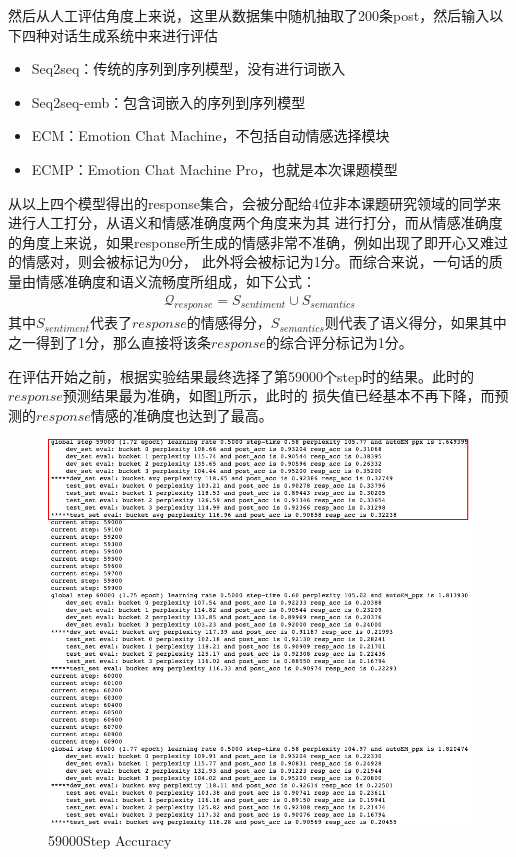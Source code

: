 \documentclass[supercite]{HustGraduPaper}
\theoremstyle{definition}
\begin{document}
然后从人工评估角度上来说，这里从数据集中随机抽取了200条post，然后输入以下四种对话生成系统中来进行评估
\begin{itemize}
  \item Seq2seq：传统的序列到序列模型，没有进行词嵌入
  \item Seq2seq-emb：包含词嵌入的序列到序列模型
  \item ECM：Emotion Chat Machine，不包括自动情感选择模块
  \item ECMP：Emotion Chat Machine Pro，也就是本次课题模型
\end{itemize}
从以上四个模型得出的response集合，会被分配给4位非本课题研究领域的同学来进行人工打分，从语义和情感准确度两个角度来为其
进行打分，而从情感准确度的角度上来说，如果response所生成的情感非常不准确，例如出现了即开心又难过的情感对，则会被标记为0分，
此外将会被标记为1分。而综合来说，一句话的质量由情感准确度和语义流畅度所组成，如下公式：
\begin{align}
  \mathcal{Q}_{response} = S_{sentiment} \cup S_{semantics} \label{5.1}
\end{align}
其中$S_{sentiment}$代表了$response$的情感得分，$S_{semantics}$则代表了语义得分，如果其中之一得到了1分，那么直接将该条$response$的综合评分标记为1分。

在评估开始之前，根据实验结果最终选择了第59000个step时的结果。此时的$response$预测结果最为准确，如图\ref{Fig.59000}所示，此时的
损失值已经基本不再下降，而预测的$response$情感的准确度也达到了最高。

\begin{figure}[H] %
  \centering %
  \includegraphics[width=1\textwidth]{images/59000.png} %
  \caption{59000Step Accuracy} %
  \label{Fig.59000} %
\end{figure}
\end{document}
